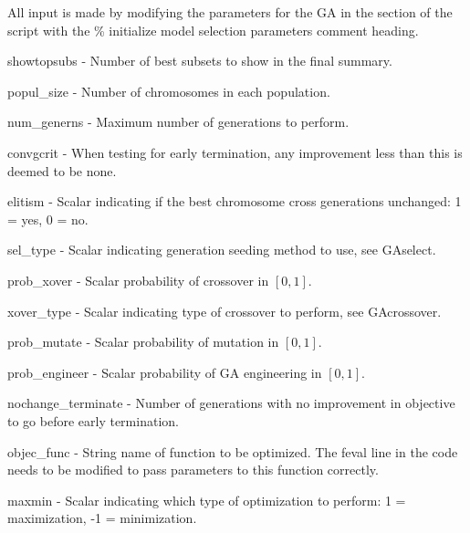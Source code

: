 \documentclass{book}
\newcommand{\textcode}[1]{\textsf{\small #1}}   %
\begin{document}
All input is made by modifying the parameters for the GA in the
section of the script with the \textcode{\% initialize model
selection parameters} comment heading.

\begin{compactitem}

\item \textcode{showtopsubs} - Number of best subsets to show in the final summary.

\item \textcode{popul\_size} - Number of chromosomes in each population.

\item \textcode{num\_generns} - Maximum number of generations to perform.

\item \textcode{convgcrit} - When testing for early termination, any improvement less than this is deemed to be none.

\item \textcode{elitism} - Scalar indicating if the best chromosome cross generations unchanged: 1 = yes, 0 = no.

\item \textcode{sel\_type} - Scalar indicating generation seeding method to use, see \textcode{GAselect}.

\item \textcode{prob\_xover} - Scalar probability of crossover in $\left[ 0,1 \right]$.

\item \textcode{xover\_type} - Scalar indicating type of crossover to perform, see \textcode{GAcrossover}.

\item \textcode{prob\_mutate} - Scalar probability of mutation in $\left[ 0,1 \right]$.

\item \textcode{prob\_engineer} - Scalar probability of GA engineering in $\left[ 0,1 \right]$.

\item \textcode{nochange\_terminate} - Number of generations with no improvement in objective to go before early termination.

\item \textcode{objec\_func} - String name of function to be optimized.  The \textcode{feval} line in the code needs to be modified to pass parameters to this function correctly.

\item \textcode{maxmin} - Scalar indicating which type of optimization to perform: 1 = maximization, -1 = minimization.


\end{compactitem}
\end{document}
